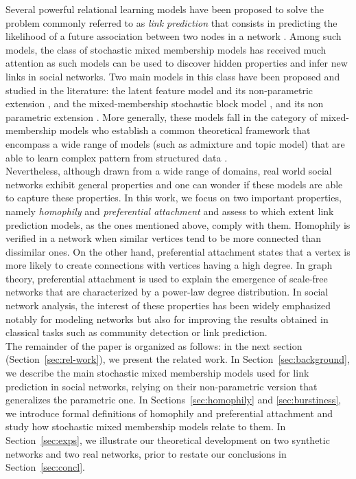 \documentclass[conference]{IEEEtran}
\begin{document}
Several powerful relational learning models have been proposed to solve the problem commonly referred to as \textit{link prediction} that consists in predicting the likelihood of a future association between two nodes in a network \cite{LibenNowell07,HassanZaki11}. Among such models, the class of stochastic mixed membership models has received much attention as such models can be used to discover hidden properties and infer new links in social networks. Two main models in this class have been proposed and studied in the literature: the latent feature model \cite{BMF} and its non-parametric extension \cite{ILFRM}, and the mixed-membership stochastic block model \cite{MMSB}, and its non parametric extension \cite{iMMSB,fan2015dynamic}. More generally, these models fall in the category of mixed-membership models who establish a common theoretical framework that encompass a wide range of models (such as admixture and topic model) that are able to  learn complex pattern from structured data \cite{airoldi2014handbook}.~\\

Nevertheless, although drawn from a wide range of domains, real world social networks exhibit general properties and one can wonder if these models are able to capture these properties. In this work, we focus on two important properties, namely \textit{homophily} and \textit{preferential attachment} \cite{Newman2010, Barabasi2003} and assess to which extent link prediction models, as the ones mentioned above, comply with them. Homophily is verified in a network when similar vertices tend to be more connected than dissimilar ones. On the other hand, preferential attachment states that a vertex is more likely to create connections with vertices having a high degree. In graph theory, preferential attachment is used to explain the emergence of scale-free networks that are characterized by a power-law degree distribution. In social network analysis, the interest of these properties has been widely emphasized notably for modeling networks but also for improving the results obtained in classical tasks such as community detection or link prediction. ~\\

The remainder of the paper is organized as follows: in the next section (Section~\ref{sec:rel-work}), we present the related work. In Section~\ref{sec:background}, we describe the main stochastic mixed membership models used for link prediction in social networks, relying on their non-parametric version that generalizes the parametric one. In Sections~\ref{sec:homophily} and \ref{sec:burstiness}, we introduce formal definitions of homophily and preferential attachment and study how stochastic mixed membership models relate to them. In Section~\ref{sec:exps}, we illustrate our theoretical development on two synthetic networks and two real networks, prior to restate our conclusions in Section~\ref{sec:concl}.
\end{document}
